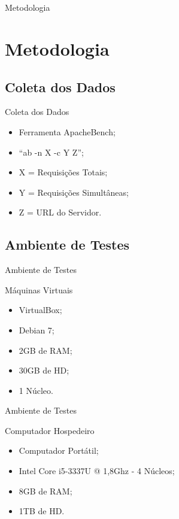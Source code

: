 \section*{}
\begin{frame}
	\centering
	{\Huge Metodologia}
\end{frame}

\section{Metodologia}\label{sec:metodologia}

\subsection*{Coleta dos Dados}

\begin{frame}{Coleta dos Dados}
	\begin{itemize}
		\item Ferramenta ApacheBench;
		\item ``ab -n X -c Y Z'';
		\item X = Requisições Totais;
		\item Y = Requisições Simultâneas;
		\item Z = URL do Servidor.
	\end{itemize}
\end{frame}

\subsection*{Ambiente de Testes}

\begin{frame}{Ambiente de Testes}
	\begin{block}{Máquinas Virtuais}
		\begin{itemize}
			\item VirtualBox;
			\item Debian 7;
			\item 2GB de RAM;
			\item 30GB de HD;
			\item 1 Núcleo.
		\end{itemize}
	\end{block}

\end{frame}
\begin{frame}{Ambiente de Testes}
	\begin{block}{Computador Hospedeiro}
		\begin{itemize}
			\item Computador Portátil;
			\item Intel Core i5-3337U @ 1,8Ghz - 4 Núcleos;
			\item 8GB de RAM;
			\item 1TB de HD.
		\end{itemize}
	\end{block}
\end{frame}

